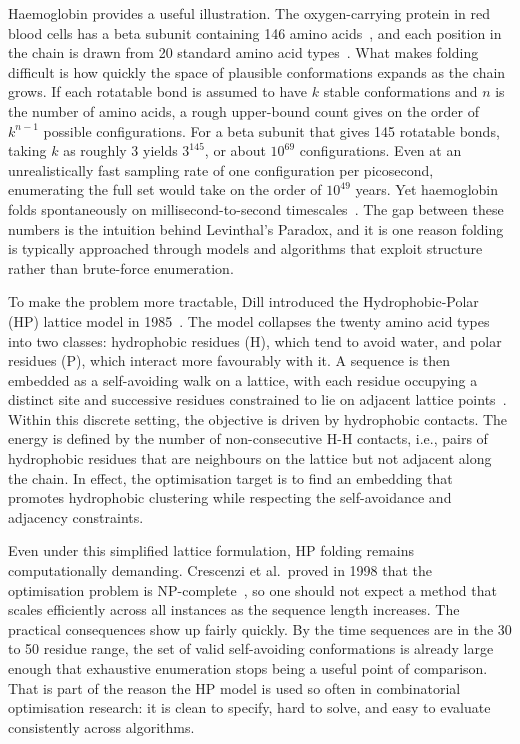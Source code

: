 \documentclass{article}
\theoremstyle{plain}
\theoremstyle{definition}
\begin{document}
Haemoglobin provides a useful illustration. The oxygen-carrying protein in red blood cells has a beta subunit containing 146 amino acids~\cite{NCBI_Hemoglobin}, and each position in the chain is drawn from 20 standard amino acid types~\cite{NCBI_AminoAcids}. What makes folding difficult is how quickly the space of plausible conformations expands as the chain grows. If each rotatable bond is assumed to have $k$ stable conformations and $n$ is the number of amino acids, a rough upper-bound count gives on the order of $k^{n-1}$ possible configurations. For a beta subunit that gives 145 rotatable bonds, taking $k$ as roughly 3 yields $3^{145}$, or about $10^{69}$ configurations. Even at an unrealistically fast sampling rate of one configuration per picosecond, enumerating the full set would take on the order of $10^{49}$ years. Yet haemoglobin folds spontaneously on millisecond-to-second timescales~\cite{Eaton1996}. The gap between these numbers is the intuition behind Levinthal's Paradox, and it is one reason folding is typically approached through models and algorithms that exploit structure rather than brute-force enumeration.

To make the problem more tractable, Dill introduced the Hydrophobic-Polar (HP) lattice model in 1985~\cite{Dill1985}. The model collapses the twenty amino acid types into two classes: hydrophobic residues (H), which tend to avoid water, and polar residues (P), which interact more favourably with it. A sequence is then embedded as a self-avoiding walk on a lattice, with each residue occupying a distinct site and successive residues constrained to lie on adjacent lattice points~\cite{Lau1989}. Within this discrete setting, the objective is driven by hydrophobic contacts. The energy is defined by the number of non-consecutive H-H contacts, i.e., pairs of hydrophobic residues that are neighbours on the lattice but not adjacent along the chain. In effect, the optimisation target is to find an embedding that promotes hydrophobic clustering while respecting the self-avoidance and adjacency constraints.

Even under this simplified lattice formulation, HP folding remains computationally demanding. Crescenzi et al.\ proved in 1998 that the optimisation problem is NP-complete~\cite{Crescenzi1998}, so one should not expect a method that scales efficiently across all instances as the sequence length increases. The practical consequences show up fairly quickly. By the time sequences are in the 30 to 50 residue range, the set of valid self-avoiding conformations is already large enough that exhaustive enumeration stops being a useful point of comparison. That is part of the reason the HP model is used so often in combinatorial optimisation research: it is clean to specify, hard to solve, and easy to evaluate consistently across algorithms.
\end{document}
